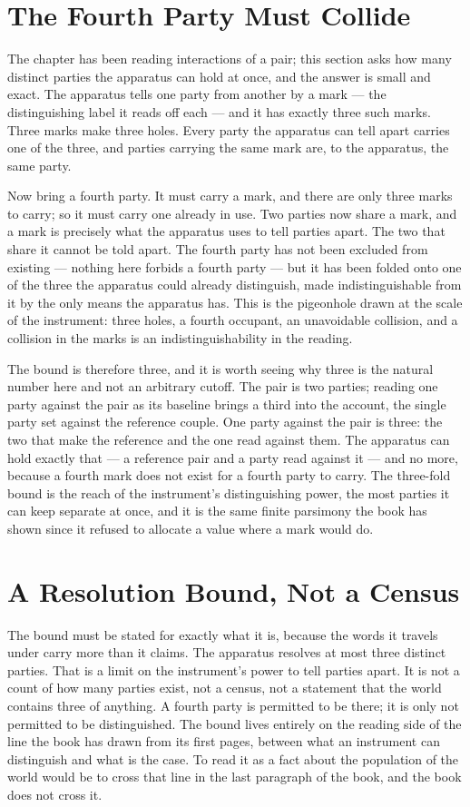 \section{The Fourth Party Must Collide}

The chapter has been reading interactions of a pair; this section asks how many distinct
parties the apparatus can hold at once, and the answer is small and exact. The apparatus tells
one party from another by a mark --- the distinguishing label it reads off each --- and it has
exactly three such marks. Three marks make three holes. Every party the apparatus can tell
apart carries one of the three, and parties carrying the same mark are, to the apparatus,
the same party.

Now bring a fourth party. It must carry a mark, and there are only three marks to carry; so it
must carry one already in use. Two parties now share a mark, and a mark is precisely what the
apparatus uses to tell parties apart. The two that share it cannot be told apart. The fourth
party has not been excluded from existing --- nothing here forbids a fourth party --- but it has
been folded onto one of the three the apparatus could already distinguish, made
indistinguishable from it by the only means the apparatus has. This is the pigeonhole drawn at
the scale of the instrument: three holes, a fourth occupant, an unavoidable collision, and a
collision in the marks is an indistinguishability in the reading.

The bound is therefore three, and it is worth seeing why three is the natural number here and
not an arbitrary cutoff. The pair is two parties; reading one party against the pair as its
baseline brings a third into the account, the single party set against the reference couple.
One party against the pair is three: the two that make the reference and the one read against
them. The apparatus can hold exactly that --- a reference pair and a party read against it ---
and no more, because a fourth mark does not exist for a fourth party to carry. The three-fold
bound is the reach of the instrument's distinguishing power, the most parties it can keep
separate at once, and it is the same finite parsimony the book has shown since it refused to
allocate a value where a mark would do.

\section{A Resolution Bound, Not a Census}

The bound must be stated for exactly what it is, because the words it travels under carry more
than it claims. The apparatus resolves at most three distinct parties. That is a limit on the
instrument's power to tell parties apart. It is not a count of how many parties exist, not a
census, not a statement that the world contains three of anything. A fourth party is permitted
to be there; it is only not permitted to be distinguished. The bound lives entirely on the
reading side of the line the book has drawn from its first pages, between what an instrument can
distinguish and what is the case. To read it as a fact about the population of the world would be
to cross that line in the last paragraph of the book, and the book does not cross it.

